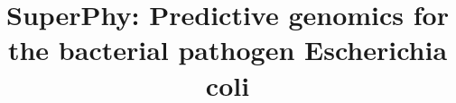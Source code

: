 \documentclass[doublespacing, linenumbers]{bmcart}
\begin{document}
\begin{frontmatter}

\begin{fmbox}


\title{SuperPhy: Predictive genomics for the bacterial pathogen Escherichia coli}


\author[
   addressref={aff1},                   %
   noteref={n1},                        %
   email={matthew.whiteside@phac-aspc.gc.ca}   %
]{ }
\author[
   addressref={aff1},
   email={chad.r.laing@phac-aspc.gc.ca},
   noteref={n1}
]{ }
\author[
  addressref={aff1},
  email={akiff.manji@phac-aspc.gc.ca}
]{ }
\author[
  addressref={aff1},
  email={peter.kruczkiewicz@phac-aspc.gc.ca}
]{ }
\author[
  addressref={aff1},
  email={eduardo.taboada@phac-aspc.gc.ca}
]{ }
\author[
  addressref={aff1},
  email={vic.gannon@phac-aspc.gc.ca},
  corref={aff1}, 
]{ }




\end{fmbox}
\end{frontmatter}
\end{document}
